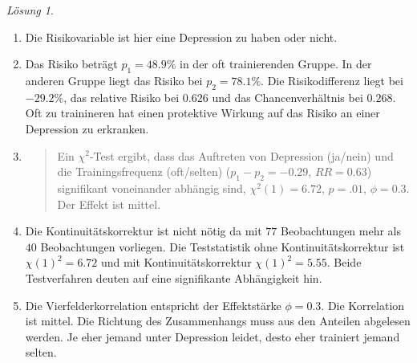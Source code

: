 \documentclass[
]{book}
\theoremstyle{definition}
\theoremstyle{definition}
\theoremstyle{definition}
\theoremstyle{definition}
\theoremstyle{remark}
\newtheorem*{solution}{Lösung}
\begin{document}
\begin{solution}
\begin{enumerate}
\def\labelenumi{\alph{enumi})}
\item
  Die Risikovariable ist hier eine Depression zu haben oder nicht.
\item
  Das Risiko beträgt
  \(p_1 = 48.9\%\) in der oft trainierenden Gruppe. In der anderen Gruppe liegt das Risiko bei \(p_2 =78.1 \%\).
  Die Risikodifferenz liegt bei
  \(-29.2\%\),
  das relative Risiko bei
  \(0.626\) und das
  Chancenverhältnis bei
  \(0.268\). Oft zu
  trainineren hat einen protektive Wirkung auf das Risiko an einer
  Depression zu erkranken.
\item
  \begin{quote}
  Ein \(\chi^2\)-Test ergibt, dass das Auftreten von Depression (ja/nein) und die Trainingsfrequenz (oft/selten) (\(p_1-p_2= -0.29\), \(RR = 0.63\)) signifikant voneinander abhängig sind, \(\chi^2 (1) = 6.72\), \(p = .01\), \(\phi = 0.3.\) Der Effekt ist mittel.
  \end{quote}
\item
  Die Kontinuitätskorrektur ist nicht nötig da mit \(77\) Beobachtungen mehr als \(40\) Beobachtungen vorliegen. Die Teststatistik ohne Kontinuitätskorrektur ist \(\chi(1)^2 = 6.72\) und mit Kontinuitätskorrektur \(\chi(1)^2 = 5.55\). Beide Testverfahren deuten auf eine signifikante Abhängigkeit hin.
\item
  Die Vierfelderkorrelation entspricht der Effektstärke \(\phi = 0.3.\) Die Korrelation ist mittel. Die Richtung des Zusammenhangs muss aus den Anteilen abgelesen werden. Je eher jemand unter Depression leidet, desto eher trainiert jemand selten.
\end{enumerate}

\end{solution}
\end{document}
